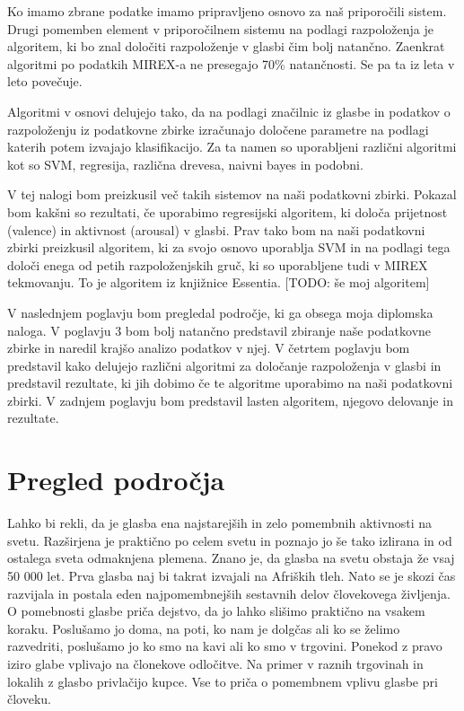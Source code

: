 \documentclass[a4paper, 12pt]{book}
\begin{document}
{Ko imamo zbrane podatke imamo pripravljeno osnovo za naš priporočili sistem. Drugi pomemben element v priporočilnem sistemu na podlagi razpoloženja je algoritem, ki bo znal določiti razpoloženje v glasbi čim bolj natančno. Zaenkrat algoritmi po podatkih MIREX-a ne presegajo 70\% natančnosti. Se pa ta iz leta v leto povečuje. 

Algoritmi v osnovi delujejo tako, da na podlagi značilnic iz glasbe in podatkov o razpoloženju iz podatkovne zbirke izračunajo določene parametre na podlagi katerih potem izvajajo klasifikacijo. Za ta namen so uporabljeni različni algoritmi kot so SVM, regresija, različna drevesa, naivni bayes in podobni. 

V tej nalogi bom preizkusil več takih sistemov na naši podatkovni zbirki. Pokazal bom kakšni so rezultati, če uporabimo regresijski algoritem, ki določa prijetnost (valence) in aktivnost (arousal) v glasbi. Prav tako bom na naši podatkovni zbirki preizkusil algoritem, ki za svojo osnovo uporablja SVM in na podlagi tega določi enega od petih razpoloženjskih gruč, ki so uporabljene tudi v MIREX tekmovanju. To je algoritem iz knjižnice Essentia. [TODO: še moj algoritem]

V naslednjem poglavju bom pregledal področje, ki ga obsega moja diplomska naloga. V poglavju 3 bom bolj natančno predstavil zbiranje naše podatkovne zbirke in naredil krajšo analizo podatkov v njej. V četrtem poglavju bom predstavil kako delujejo različni algoritmi za določanje razpoloženja v glasbi in predstavil rezultate, ki jih dobimo če te algoritme uporabimo na naši podatkovni zbirki. V zadnjem poglavju bom predstavil lasten algoritem, njegovo delovanje in rezultate. 

\chapter{Pregled področja}

Lahko bi rekli, da je glasba ena najstarejših in zelo pomembnih aktivnosti na svetu. Razširjena je praktično po celem svetu in poznajo jo še tako izlirana in od ostalega sveta odmaknjena plemena. Znano je, da glasba na svetu obstaja že vsaj 50 000 let. Prva glasba naj bi takrat izvajali na Afriških tleh. Nato se je skozi čas razvijala in postala eden najpomembnejših sestavnih delov človekovega življenja. \cite{wallin2001origins} \cite{krause2012great} O pomebnosti glasbe priča dejstvo, da jo lahko slišimo praktično na vsakem koraku. Poslušamo jo doma, na poti, ko nam je dolgčas ali ko se želimo razvedriti, poslušamo jo ko smo na kavi ali ko smo v trgovini. Ponekod z pravo iziro glabe vplivajo na člonekove odločitve. Na primer v raznih trgovinah in lokalih z glasbo privlačijo kupce. Vse to priča o pomembnem vplivu glasbe pri človeku.  

}
\end{document}
